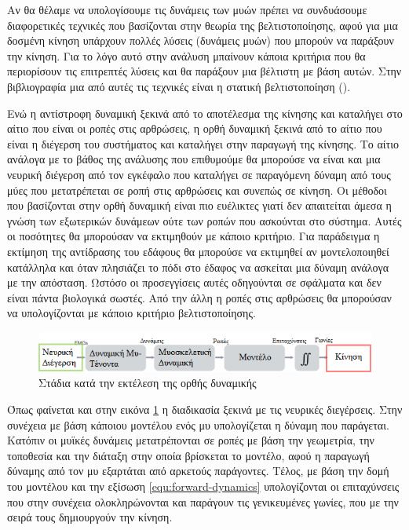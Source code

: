 Αν θα θέλαμε να υπολογίσουμε τις δυνάμεις των μυών πρέπει να συνδυάσουμε διαφορετικές τεχνικές που βασίζονται στην θεωρία της βελτιστοποίησης, αφού για μια δοσμένη κίνηση υπάρχουν πολλές λύσεις (δυνάμεις μυών) που μπορούν να παράξουν την κίνηση. Για το λόγο αυτό στην ανάλυση μπαίνουν κάποια κριτήρια που θα περιορίσουν τις επιτρεπτές λύσεις και θα παράξουν μια βέλτιστη με βάση αυτών. Στην βιβλιογραφία μια από αυτές τις τεχνικές είναι η στατική βελτιστοποίηση ().

Ενώ η αντίστροφη δυναμική ξεκινά από το αποτέλεσμα της κίνησης και καταλήγει στο αίτιο που είναι οι ροπές στις αρθρώσεις, η ορθή δυναμική ξεκινά από το αίτιο που είναι η διέγερση του συστήματος και καταλήγει στην παραγωγή της κίνησης. Το αίτιο ανάλογα με το βάθος της ανάλυσης που επιθυμούμε θα μπορούσε να είναι και μια νευρική διέγερση από τον εγκέφαλο που καταλήγει σε παραγόμενη δύναμη από τους μύες που μετατρέπεται σε ροπή στις αρθρώσεις και συνεπώς σε κίνηση. Οι μέθοδοι που βασίζονται στην ορθή δυναμική είναι πιο ευέλικτες γιατί δεν απαιτείται άμεσα η γνώση των εξωτερικών δυνάμεων ούτε των ροπών που ασκούνται στο σύστημα. Αυτές οι ποσότητες θα μπορούσαν να εκτιμηθούν με κάποιο κριτήριο. Για παράδειγμα η εκτίμηση της αντίδρασης του εδάφους θα μπορούσε να εκτιμηθεί αν μοντελοποιηθεί κατάλληλα και όταν πλησιάζει το πόδι στο έδαφος να ασκείται μια δύναμη ανάλογα με την απόσταση. Ωστόσο οι προσεγγίσεις αυτές οδηγούνται σε σφάλματα και δεν είναι πάντα βιολογικά σωστές. Από την άλλη η ροπές στις αρθρώσεις θα μπορούσαν να υπολογίζονται με κάποιο κριτήριο βελτιστοποίησης.

\begin{figure}[H]
    \centering
    \includegraphics[width=1.0\textwidth, keepaspectratio]{fig/forward-simulation.png}
    \caption{Στάδια κατά την εκτέλεση της ορθής δυναμικής\protect\footnotemark}
    \label{fig:forward-simulation}
\end{figure}

Όπως φαίνεται και στην εικόνα \ref{fig:forward-simulation} η διαδικασία ξεκινά με τις νευρικές διεγέρσεις. Στην συνέχεια με βάση κάποιου μοντέλου ενός μυ υπολογίζεται η δύναμη που παράγεται. Κατόπιν οι μυϊκές δυνάμεις μετατρέπονται σε ροπές με βάση την γεωμετρία, την τοποθεσία και την διάταξη στην οποία βρίσκεται το μοντέλο, αφού η παραγωγή δύναμης από τον μυ εξαρτάται από αρκετούς παράγοντες. Τέλος, με βάση την δομή του μοντέλου και την εξίσωση \ref{equ:forward-dynamics} υπολογίζονται οι επιταχύνσεις που στην συνέχεια ολοκληρώνονται και παράγουν τις γενικευμένες γωνίες, που με την σειρά τους δημιουργούν την κίνηση.

